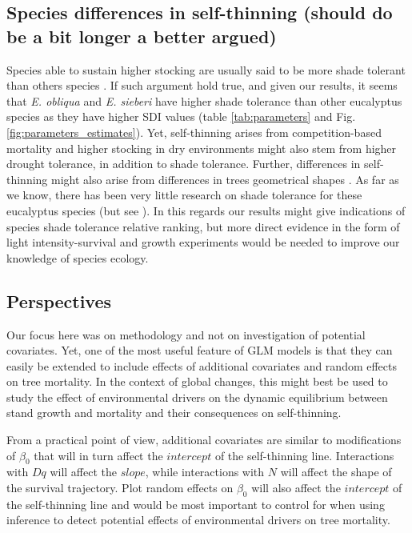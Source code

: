 \documentclass[12pt,english]{article}
\begin{document}
\subsection{Species differences in self-thinning (should do be a bit longer a better argued)}
Species able to sustain higher stocking are usually said to be more shade tolerant than others species \citep{JackLong1996}. If such argument hold true, and given our results, it seems that \textit{E. obliqua} and \textit{E. sieberi} have higher shade tolerance than other eucalyptus species as they have higher SDI values (table \ref{tab:parameters} and Fig.\ref{fig:parameters_estimates}). Yet, self-thinning arises from competition-based mortality and higher stocking in dry environments might also stem from higher drought tolerance, in addition to shade tolerance. Further, differences in self-thinning might also arise from differences in trees geometrical shapes \citep{PretzschBiber2005}. As far as we know, there has been very little research on shade tolerance for these eucalyptus species (but see \citep{Florence1996}). In this regards our results might give indications of species shade tolerance relative ranking, but more direct evidence in the form of light intensity-survival and growth experiments would be needed to improve our knowledge of species ecology.

\subsection{Perspectives}
Our focus here was on methodology and not on investigation of potential covariates. Yet, one of the most useful feature of GLM models is that they can easily be extended to include effects of additional covariates and random effects \citep{BolkerBrooksClarkEtAl2009} on tree mortality. In the context of global changes, this might best be used to study the effect of environmental drivers on the dynamic equilibrium between stand growth and mortality and their consequences on self-thinning.

From a practical point of view, additional covariates are similar to modifications of $\beta_0$ that will in turn affect the $intercept$ of the self-thinning line. Interactions with $Dq$ will affect the $slope$, while interactions with $N$ will affect the shape of the survival trajectory. Plot random effects on $\beta_0$ will also affect the $intercept$ of the self-thinning line \citep{LeGoffOttoriniNingre2011, VanderSchaafBurkhart2007} and would be most important to control for when using inference to detect potential effects of environmental drivers on tree mortality.
\end{document}
